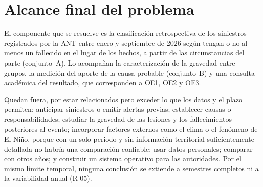 \section{Alcance final del problema}

El componente que se resuelve es la clasificación retrospectiva de los siniestros registrados por la ANT entre enero y septiembre de 2026 según tengan o no al menos un fallecido en el lugar de los hechos, a partir de las circunstancias del parte (conjunto~A). Lo acompañan la caracterización de la gravedad entre grupos, la medición del aporte de la causa probable (conjunto~B) y una consulta académica del resultado, que corresponden a OE1, OE2 y OE3.

Quedan fuera, por estar relacionados pero exceder lo que los datos y el plazo permiten: anticipar siniestros o emitir alertas previas; establecer causas o responsabilidades; estudiar la gravedad de las lesiones y los fallecimientos posteriores al evento; incorporar factores externos como el clima o el fenómeno de El Niño, porque con un solo periodo y sin información territorial suficientemente detallada no habría una comparación confiable; usar datos personales; comparar con otros años; y construir un sistema operativo para las autoridades. Por el mismo límite temporal, ninguna conclusión se extiende a semestres completos ni a la variabilidad anual (R-05).
